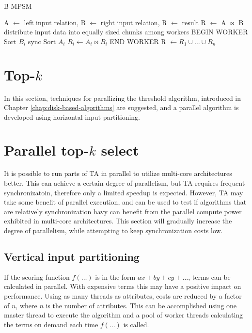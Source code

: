 \begin{algorithm}[H]
	\caption{B-MPSM}
	\label{alg:bmpsm}
	\begin{algorithmic}
		\REQUIRE A $\leftarrow$ left input relation, B $\leftarrow$ right
		input relation, R $\leftarrow$ result
		\ENSURE R $\leftarrow$ A $\bowtie$ B
		\STATE distribute input data into equally sized chunks among workers
		\STATE BEGIN WORKER 
		\STATE Sort $B_i$
		\STATE sync
		\STATE Sort $A_i$
			\STATE $R_i \leftarrow A_i \bowtie B_i$
		\ENDFOR
		\STATE END WORKER
		\STATE R $\leftarrow R_1 \cup \ldots \cup R_n$
	\end{algorithmic}
\end{algorithm}

\section{Top-$k$}

In this section, techniques for parallizing the threshold algorithm,
introduced in Chapter \ref{chap:disk-based-algorithms} are suggested,
and a parallel algorithm is developed using horizontal input
partitioning.

\section{Parallel top-$k$ select}
\label{sec:parallel-top-k}

It is possible to run parts of TA in parallel to utilize multi-core
architectures better. This can achieve a certain degree of
parallelism, but TA requires frequent synchronizatoin, therefore only
a limited speedup is expected. However, TA may take some benefit of
parallel execution, and can be used to test if algorithms that are
relatively synchronization havy can benefit from the parallel compute
power exhibited in multi-core architectures. This section will
gradually increase the degree of parallelism, while attempting to keep
synchronization costs low.

\subsection{Vertical input partitioning}

If the scoring function $f(\ldots)$ is in the form $ax + by + cy +
\ldots$, terms can be calculated in parallel. With expensive terms
this may have a positive impact on performance. Using as many threads
as attributes, costs are reduced by a factor of $n$, where $n$ is the
number of attributes. This can be accomplished using one master thread
to execute the algorithm and a pool of worker threads calculating the
terms on demand each time $f(\ldots)$ is called.

